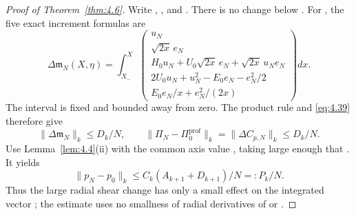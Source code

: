 \begin{proof}[Proof of Theorem~\ref{thm:4.6}]
Write ,
, and
. There is no change
below . For , the five exact
increment formulas are
\[
\Delta\mathfrak m_N(X,\eta)=\int_{X_-}^{X}
\begin{pmatrix}
u_N\\
\sqrt{2x}\,e_N\\
H_0u_N+U_0\sqrt{2x}\,e_N+\sqrt{2x}\,u_Ne_N\\
2U_0u_N+u_N^2-E_0e_N-e_N^2/2\\
E_0e_N/x+e_N^2/(2x)
\end{pmatrix}dx.
\]
The interval is fixed and bounded away from zero. The product rule and \eqref{eq:4.39}
therefore give
\[
\lVert\Delta\mathfrak m_N\rVert_k\le D_k/N,
\qquad
\lVert\Pi_N-\Pi_0^{\mathrm{prof}}\rVert_k
=\lVert\Delta C_{p,N}\rVert_k\le D_k/N.
\]
Use Lemma~\ref{lem:4.4}(ii) with the common axis value
, taking  large enough that
. It yields
\begin{equation}
\lVert p_N-p_0\rVert_k\le C_k(A_{k+1}+D_{k+1})/N=:P_k/N.
\tag{4.40}\label{eq:4.40}
\end{equation}
Thus the large radial shear change has only a small effect on the integrated vector
; the estimate uses no smallness of radial derivatives of
 or .


\end{proof}
